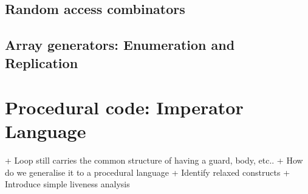 \documentclass[preamble.tex]{subfiles}
\begin{document}


\subsection{Random access combinators}



\subsection{Array generators: Enumeration and Replication}



\section{Procedural code: Imperator Language}

+ Loop still carries the common structure of having a guard, body, etc..
+ How do we generalise it to a procedural language
+ Identify relaxed constructs
+ Introduce simple liveness analysis


\IfNotCompilingAll{}
\end{document}
